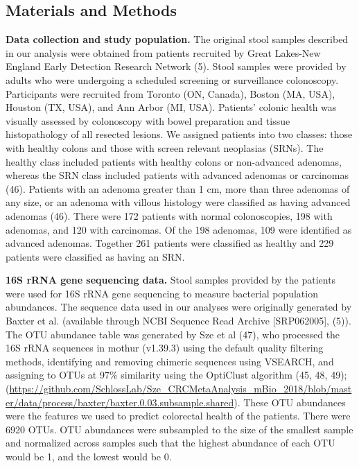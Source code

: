 \documentclass[11pt,]{article}
\begin{document}
\subsection{Materials and Methods}\label{materials-and-methods}

\textbf{Data collection and study population.} The original stool
samples described in our analysis were obtained from patients recruited
by Great Lakes-New England Early Detection Research Network (5). Stool
samples were provided by adults who were undergoing a scheduled
screening or surveillance colonoscopy. Participants were recruited from
Toronto (ON, Canada), Boston (MA, USA), Houston (TX, USA), and Ann Arbor
(MI, USA). Patients' colonic health was visually assessed by colonoscopy
with bowel preparation and tissue histopathology of all resected
lesions. We assigned patients into two classes: those with healthy
colons and those with screen relevant neoplasias (SRNs). The healthy
class included patients with healthy colons or non-advanced adenomas,
whereas the SRN class included patients with advanced adenomas or
carcinomas (46). Patients with an adenoma greater than 1 cm, more than
three adenomas of any size, or an adenoma with villous histology were
classified as having advanced adenomas (46). There were 172 patients
with normal colonoscopies, 198 with adenomas, and 120 with carcinomas.
Of the 198 adenomas, 109 were identified as advanced adenomas. Together
261 patients were classified as healthy and 229 patients were classified
as having an SRN.

\textbf{16S rRNA gene sequencing data.} Stool samples provided by the
patients were used for 16S rRNA gene sequencing to measure bacterial
population abundances. The sequence data used in our analyses were
originally generated by Baxter et al. (available through NCBI Sequence
Read Archive {[}SRP062005{]}, (5)). The OTU abundance table was
generated by Sze et al (47), who processed the 16S rRNA sequences in
mothur (v1.39.3) using the default quality filtering methods,
identifying and removing chimeric sequences using VSEARCH, and assigning
to OTUs at 97\% similarity using the OptiClust algorithm (45, 48, 49);
(\url{https://github.com/SchlossLab/Sze_CRCMetaAnalysis_mBio_2018/blob/master/data/process/baxter/baxter.0.03.subsample.shared}).
These OTU abundances were the features we used to predict colorectal
health of the patients. There were 6920 OTUs. OTU abundances were
subsampled to the size of the smallest sample and normalized across
samples such that the highest abundance of each OTU would be 1, and the
lowest would be 0.
\end{document}
